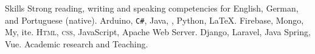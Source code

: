 
\begin{rubric}{Skills}
\entry*[Languages]
	Strong reading, writing and speaking competencies for English, German, and Portuguese (native).
	Arduino, \texttt{C\#}, Java, , Python, \LaTeX.
\entry*[Databases]
	Firebase, Mongo, My, ite.
	\textsc{Html, css}, JavaScript, Apache Web Server.
 \entry*[Frameworks]
	Django, Laravel, Java Spring, Vue.
\entry*[Misc.]
	Academic research and Teaching.
\end{rubric}
